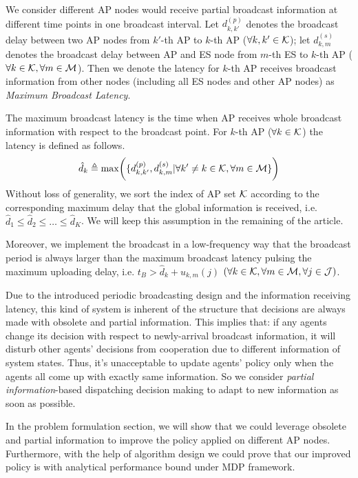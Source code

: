 We consider different AP nodes would receive partial broadcast information at different time points in one broadcast interval.
Let $d^{(p)}_{k,k'}$ denotes the broadcast delay between two AP nodes from $k'$-th AP to $k$-th AP ($\forall k,k'\in\mathcal{K}$); let $d^{(s)}_{k,m}$ denotes the broadcast delay between AP and ES node from $m$-th ES to $k$-th AP ($\forall k\in\mathcal{K},\forall m\in\mathcal{M}$).
Then we denote the latency for $k$-th AP receives broadcast information from other nodes (including all ES nodes and other AP nodes) as \emph{Maximum Broadcast Latency}.
\begin{definition}
    The maximum broadcast latency is the time when AP receives whole broadcast information with respect to the broadcast point. For $k$-th AP ($\forall k\in\mathcal{K}$) the latency is defined as follows.
    \begin{align}
        \hat{d}_{k} \define \max\Paren{ \set{d^{(p)}_{k,k'}, d^{(s)}_{k,m}|\forall k' \neq k \in\apSet, \forall m\in\esSet} }
    \end{align}
    Without loss of generality, we sort the index of AP set $\mathcal{K}$ according to the corresponding maximum delay that the global information is received, i.e. $\hat{d}_{1} \leq \hat{d}_{2} \leq \dots \leq \hat{d}_{K}$. We will keep this assumption in the remaining of the article.
\end{definition}
{\color{red}
Moreover, we implement the broadcast in a low-frequency way that the broadcast period is always larger than the maximum broadcast latency pulsing the maximum uploading delay, i.e. $t_B > \hat{d}_{k} + u_{k,m}(j)$ $(\forall k\in\mathcal{K}, \forall m\in\mathcal{M}, \forall j\in\mathcal{J})$.
}

{\color{red}
    Due to the introduced periodic broadcasting design and the information receiving latency, this kind of system is inherent of the structure that decisions are always made with obsolete and partial information.
    This implies that: if any agents change its decision with respect to newly-arrival broadcast information, it will disturb other agents' decisions from cooperation due to different information of system states.
    Thus, it's unacceptable to update agents' policy only when the agents all come up with exactly same information.
    So we consider \emph{partial information}-based dispatching decision making to adapt to new information as soon as possible.
}
        
In the problem formulation section, we will show that we could leverage obsolete and partial information to improve the policy applied on different AP nodes. Furthermore, with the help of algorithm design we could prove that our improved policy is with analytical performance bound under MDP framework.
